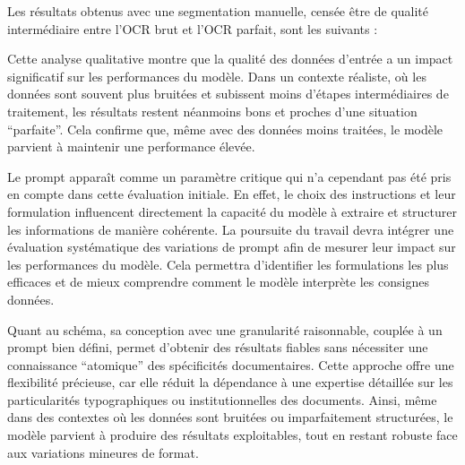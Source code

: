 Les résultats obtenus avec une segmentation manuelle, censée être de qualité intermédiaire entre l'OCR brut et l'OCR parfait, sont les suivants :

\begin{table}[h]
	\centering
	\caption{Résultats des évaluations des pages avec une qualité OCR intermédiaire.}
	\label{tab:intermediate_ocr_results}
\end{table}


Cette analyse qualitative montre que la qualité des données d'entrée a un impact significatif sur les performances du modèle. Dans un contexte réaliste, où les données sont souvent plus bruitées et subissent moins d'étapes intermédiaires de traitement, les résultats restent néanmoins bons et proches d'une situation \enquote{parfaite}. Cela confirme que, même avec des données moins traitées, le modèle parvient à maintenir une performance élevée.

Le prompt apparaît comme un paramètre critique qui n'a cependant pas été pris en compte dans cette évaluation initiale. En effet, le choix des instructions et leur formulation influencent directement la capacité du modèle à extraire et structurer les informations de manière cohérente. La poursuite du travail devra intégrer une évaluation systématique des variations de prompt afin de mesurer leur impact sur les performances du modèle. Cela permettra d'identifier les formulations les plus efficaces et de mieux comprendre comment le modèle interprète les consignes données.

Quant au schéma, sa conception avec une granularité raisonnable, couplée à un prompt bien défini, permet d’obtenir des résultats fiables sans nécessiter une connaissance \enquote{atomique} des spécificités documentaires. Cette approche offre une flexibilité précieuse, car elle réduit la dépendance à une expertise détaillée sur les particularités typographiques ou institutionnelles des documents. Ainsi, même dans des contextes où les données sont bruitées ou imparfaitement structurées, le modèle parvient à produire des résultats exploitables, tout en restant robuste face aux variations mineures de format.

